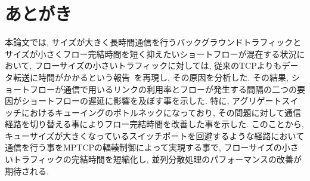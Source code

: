 \documentclass[10pt, a4paper, twocolumn]{jsarticle}
\begin{document}
%
%

\section{あとがき}
\label{sec:conclude}
本論文では, サイズが大きく長時間通信を行うバックグラウンドトラフィックとサイズが小さくフロー完結時間を短く抑えたいショートフローが混在する状況において, フローサイズの小さいトラフィックに対しては,
従来のTCPよりもデータ転送に時間がかかるという報告~\cite{improving}を再現し, その原因を分析した.
その結果, ショートフローが通信で用いるリンクの利用率とフローが発生する間隔の二つの要因がショートフローの遅延に影響を及ぼす事を示した.
特に, アグリゲートスイッチにおけるキューイングのボトルネックになっており, その問題に対して通信経路を切り替える事によりフロー完結時間を改善した事を示した.
このことから, キューサイズが大きくなっているスイッチポートを回避するような経路において通信を行う事をMPTCPの輻輳制御によって実現する事で,
フローサイズの小さいトラフィックの完結時間を短縮化し, 並列分散処理のパフォーマンスの改善が期待される.
\end{document}
